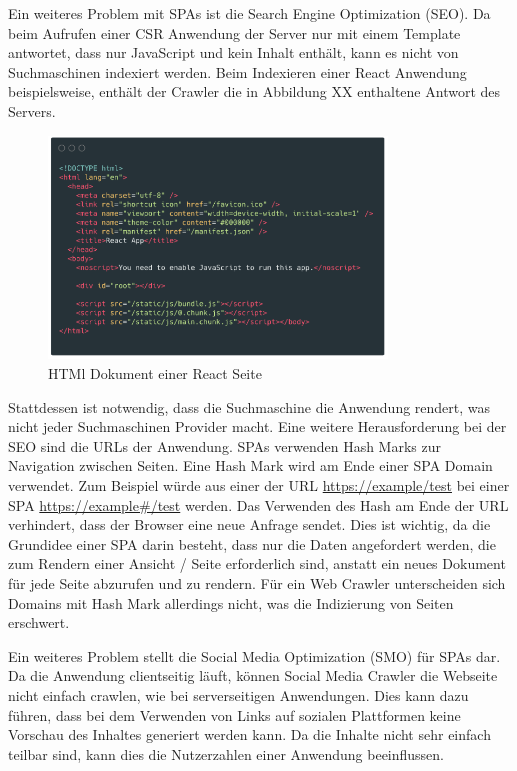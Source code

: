 \documentclass[runningheads]{llncs}
\begin{document}
Ein weiteres Problem mit SPAs ist die Search Engine Optimization (SEO). 
Da beim Aufrufen einer CSR Anwendung der Server nur mit einem Template 
antwortet, dass nur JavaScript und kein Inhalt enthält, 
kann es nicht von Suchmaschinen indexiert werden. 
Beim Indexieren einer React Anwendung beispielsweise, 
enthält der Crawler die in Abbildung XX enthaltene Antwort des Servers. 

\begin{figure}[h]
  \centering
  \includegraphics[width=9cm]{images/react-code-small}
  \caption{HTMl Dokument einer React Seite}
\end{figure}

Stattdessen ist notwendig, dass die Suchmaschine die Anwendung rendert, 
was nicht jeder Suchmaschinen Provider macht. 
Eine weitere Herausforderung bei der SEO sind die URLs der Anwendung. 
SPAs verwenden Hash Marks zur Navigation zwischen Seiten. 
Eine Hash Mark wird am Ende einer SPA Domain verwendet. 
Zum Beispiel würde aus einer der URL \url{https://example/test} bei einer SPA 
\url{https://example#/test} werden. 
Das Verwenden des Hash am Ende der URL verhindert, 
dass der Browser eine neue Anfrage sendet. 
Dies ist wichtig, da die Grundidee einer SPA darin besteht, 
dass nur die Daten angefordert werden, 
die zum Rendern einer Ansicht / Seite erforderlich sind, 
anstatt ein neues Dokument für jede Seite abzurufen und zu rendern. 
Für ein Web Crawler unterscheiden sich Domains mit Hash Mark allerdings 
nicht, was die Indizierung von Seiten erschwert.

Ein weiteres Problem stellt die Social Media Optimization (SMO) für SPAs dar. 
Da die Anwendung clientseitig läuft, 
können Social Media Crawler die Webseite nicht einfach crawlen, 
wie bei serverseitigen Anwendungen. Dies kann dazu führen, 
dass bei dem Verwenden von Links auf sozialen Plattformen 
keine Vorschau des Inhaltes generiert werden kann. 
Da die Inhalte nicht sehr einfach teilbar sind, 
kann dies die  Nutzerzahlen einer Anwendung beeinflussen.
\end{document}
